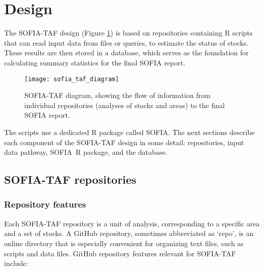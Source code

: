 \documentclass[12pt]{article}
\newcommand\SOFIA{{\sf SOFIA}}
\begin{document}

\section{Design}

The SOFIA-TAF design (Figure \ref{fig:sofia-taf-diagram}) is based on
repositories containing R scripts that can read input data from files or
queries, to estimate the status of stocks. These results are then stored in a
database, which serves as the foundation for calculating summary statistics for
the final SOFIA report.

\begin{figure}[htb]
  \begin{center}
    \texttt{[image: sofia\_taf\_diagram]}
    \vspace{2ex}
    \caption{SOFIA-TAF diagram, showing the flow of information from individual
      repositories (analyses of stocks and areas) to the final SOFIA report.}
    \label{fig:sofia-taf-diagram}
  \end{center}
\end{figure}

The scripts use a dedicated R package called \SOFIA. The next sections describe
each component of the SOFIA-TAF design in some detail: repositories, input data
pathway, \SOFIA\ R package, and the database.

\subsection{SOFIA-TAF repositories}

\subsubsection{Repository features}

Each SOFIA-TAF repository is a unit of analysis, corresponding to a specific
area and a set of stocks. A GitHub repository, sometimes abbreviated as `repo',
is an online directory that is especially convenient for organizing text files,
such as scripts and data files. GitHub repository features relevant for
SOFIA-TAF include:
\end{document}
